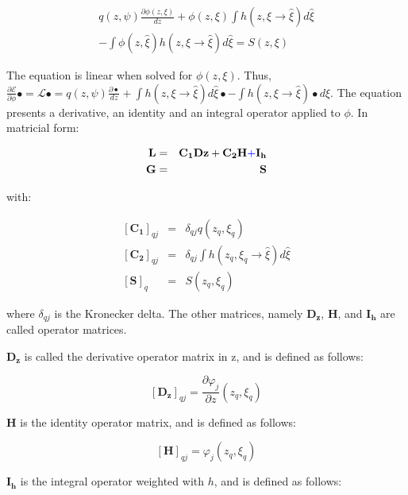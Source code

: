 \documentclass{CFD2011}
\newcommand{\Pablo}[1]{\textcolor{blue}{#1}}
\begin{document}
\begin{eqnarray}
q(z,\psi)\frac{\partial \phi(z,\xi)}{dz} +\phi(z,\xi)\int h(z,\xi\rightarrow\hat{\xi})d\hat{\xi} \nonumber \\
-\int \phi(z,\hat{\xi}) h(z,\xi\rightarrow\hat{\xi})d\hat{\xi} = S(z,\xi)
\end{eqnarray}

The equation is linear when solved for $\phi(z,\xi)$. Thus, $\frac{\partial \mathcal{E}}{\partial \phi}\bullet=\mathcal{L}\bullet=q(z,\psi)\frac{\partial \bullet}{dz} +\int h(z,\xi\rightarrow\hat{\xi})d\hat{\xi}\bullet -\int h(z,\xi\rightarrow\hat{\xi})\bullet d\hat{\xi}$. The equation presents a derivative, an identity and an integral operator applied to $\phi$. In matricial form:

\begin{eqnarray}
\mathbf{L}&=&\mathbf{C_1}\mathbf{Dz}+\mathbf{C_2}\mathbf{H} \Pablo{+} \mathbf{I_h} \\
\mathbf{G}&=&\mathbf{S}
\end{eqnarray}

\noindent with:

\begin{eqnarray}
\left[\mathbf{C_1}\right]_{qj}&=& \delta_{qj}q(z_q,\xi_q) \nonumber \\
\left[\mathbf{C_2}\right]_{qj}&=& \delta_{qj}\int h(z_q,\xi_q\rightarrow\hat{\xi})d\hat{\xi} \nonumber \\
\left[\mathbf{S}\right]_{q}&=& S(z_q,\xi_q) \nonumber 
\end{eqnarray}

\noindent where $\delta_{qj}$ is the Kronecker delta. The other matrices, namely $\mathbf{D_z}$, $\mathbf{H}$, and $\mathbf{I_h}$ are called operator matrices.


$\mathbf{D_z}$ is called the derivative operator matrix in z, and is defined as follows:

\begin{equation}
\left[\mathbf{D_z}\right]_{qj}=\frac{\partial \varphi_j}{\partial z}(z_q,\xi_q)
\end{equation}

$\mathbf{H}$ is the identity operator matrix, and is defined as follows:

\begin{equation}
\left[\mathbf{H}\right]_{qj}=\varphi_j(z_q,\xi_q)
\end{equation}

$\mathbf{I_h}$ is the integral operator weighted with $h$, and is defined as follows:
\end{document}
